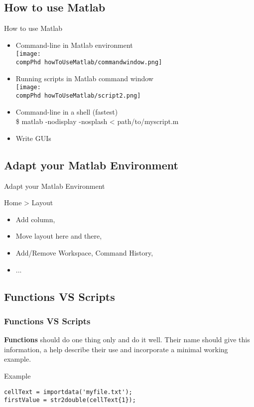 \documentclass[]{beamer} %
\def\pathbase{/Users/pmxal9/} 	%
\def\pathbase{/Users/pmaal/} 	%
\edef\drop{\pathbase Dropbox/}		%
\edef\compPhd{\drop Nottingham/repos/phd/Seminars/+MatlabComputationalPhD/}
\begin{document}
\subsection{How to use Matlab}
\begin{frame}{How to use Matlab}\centering
\begin{itemize}[<+(0)->]
\item Command-line in Matlab environment\\
\texttt{[image: \\compPhd howToUseMatlab/commandwindow.png]}
\item Running scripts in Matlab command window\\
\texttt{[image: \\compPhd howToUseMatlab/script2.png]}
\item Command-line in a shell (fastest)\\
\$ matlab -nodisplay -nosplash < path/to/myscript.m
\item Write GUIs
\end{itemize}
\end{frame}


\subsection{Adapt your Matlab Environment}
\begin{frame}{Adapt your Matlab Environment}\centering
\begin{block}{Home > Layout}
\pause
\begin{itemize}
\item Add column,
\item Move layout here and there,
\item Add/Remove Workspace, Command History,
\item ...
\end{itemize}
\end{block}
\end{frame}


\subsection{Functions VS Scripts}
\begin{frame}[fragile]%
\centering
\frametitle{Functions VS Scripts}
\begin{block}{\textbf{Functions} should do one thing only}
and do it well. Their name should give this information, a help describe their use and incorporate a minimal working example.
\end{block}
\begin{exampleblock}{Example}
\vspace{-4mm}
\begin{verbatim}cellText = importdata('myfile.txt'); 
firstValue = str2double(cellText{1});
\end{verbatim}
\end{exampleblock}
\end{frame}
\end{document}
